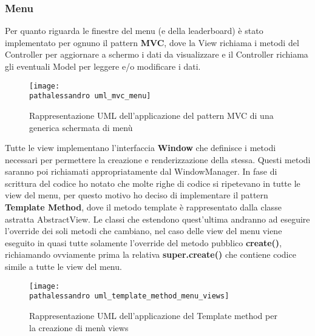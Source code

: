 \documentclass[a4paper,12pt]{report}
\newcommand\pathalessandro{img/alessandro/}
\begin{document}
\subsubsection{Menu}
Per quanto riguarda le finestre del menu (e della leaderboard) è stato implementato per ognuno il pattern \textbf{MVC}, dove la View richiama i metodi del Controller
per aggiornare a schermo i dati da visualizzare e il Controller richiama gli eventuali Model per leggere e/o modificare i dati. \\
\begin{figure}[!htb]
	\centerline{\texttt{[image: \\pathalessandro uml\_mvc\_menu]}}
	\caption{Rappresentazione UML dell'applicazione del pattern MVC di una generica schermata di menù}
	\label{img:uml_mvc_menu}
\end{figure}
\clearpage \hfill\break
Tutte le view implementano l'interfaccia \textbf{Window} che definisce i metodi necessari per permettere la creazione e renderizzazione della stessa.
Questi metodi saranno poi richiamati appropriatamente dal WindowManager.
In fase di scrittura del codice ho notato che molte righe di codice si ripetevano in tutte le view del menu, per questo motivo ho deciso di implementare il pattern \textbf{Template Method},
dove il metodo template è rappresentato dalla classe astratta AbstractView. Le classi che estendono quest'ultima andranno ad eseguire l'override dei soli metodi che cambiano, nel caso delle 
view del menu viene eseguito in quasi tutte solamente l'override del metodo pubblico \textbf{create()}, richiamando ovviamente prima la relativa \textbf{super.create()} che contiene
codice simile a tutte le view del menu.
\begin{figure}[!htb]
	\centerline{\texttt{[image: \\pathalessandro uml\_template\_method\_menu\_views]}}
	\caption{Rappresentazione UML dell'applicazione del Template method per la creazione di menù views}
	\label{img:uml_template_method_menu_views}
\end{figure}
\clearpage \hfill\break
\end{document}
